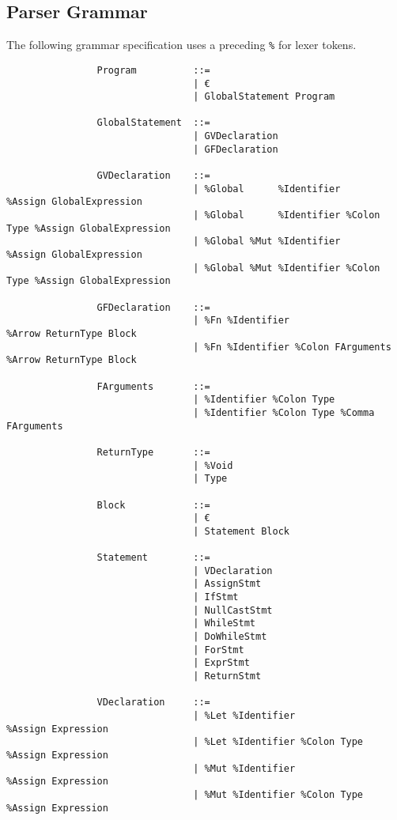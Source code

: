 \documentclass{article}
\begin{document}
		\subsection{Parser Grammar}
		
			The following grammar specification uses a preceding \texttt{\%} for lexer tokens.
		
			\begin{verbatim}
				Program          ::=
				                 | €
				                 | GlobalStatement Program
				                 
				GlobalStatement  ::=
				                 | GVDeclaration
				                 | GFDeclaration
				                 
				GVDeclaration    ::=
				                 | %Global      %Identifier             %Assign GlobalExpression
				                 | %Global      %Identifier %Colon Type %Assign GlobalExpression
				                 | %Global %Mut %Identifier             %Assign GlobalExpression
				                 | %Global %Mut %Identifier %Colon Type %Assign GlobalExpression
				                 
				GFDeclaration    ::=
				                 | %Fn %Identifier                   %Arrow ReturnType Block
				                 | %Fn %Identifier %Colon FArguments %Arrow ReturnType Block
				                 
				FArguments       ::=
				                 | %Identifier %Colon Type
				                 | %Identifier %Colon Type %Comma FArguments
				
				ReturnType       ::=
				                 | %Void
				                 | Type
				                 
				Block            ::=
				                 | €
				                 | Statement Block
				
				Statement        ::=
				                 | VDeclaration
				                 | AssignStmt
				                 | IfStmt
				                 | NullCastStmt
				                 | WhileStmt
				                 | DoWhileStmt
				                 | ForStmt
				                 | ExprStmt
				                 | ReturnStmt
				                 
				VDeclaration     ::=
				                 | %Let %Identifier             %Assign Expression
				                 | %Let %Identifier %Colon Type %Assign Expression
				                 | %Mut %Identifier             %Assign Expression
				                 | %Mut %Identifier %Colon Type %Assign Expression
				                 

\end{verbatim}
\end{document}
